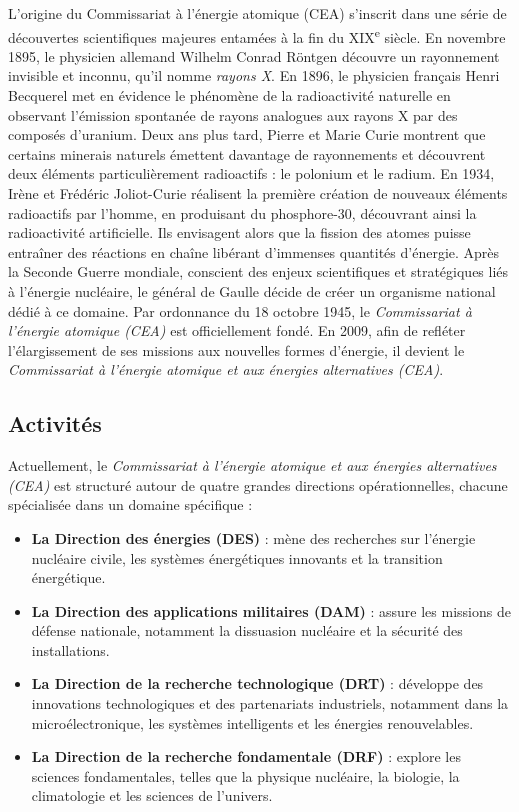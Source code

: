 \documentclass[12pt,a4paper]{report}
\begin{document}
L'origine du Commissariat à l'énergie atomique (CEA) s'inscrit dans une série de découvertes scientifiques majeures entamées à la fin du XIX\textsuperscript{e} siècle. En novembre 1895, le physicien allemand Wilhelm Conrad Röntgen découvre un rayonnement invisible et inconnu, qu'il nomme \textit{rayons X}. En 1896, le physicien français Henri Becquerel met en évidence le phénomène de la radioactivité naturelle en observant l'émission spontanée de rayons analogues aux rayons X par des composés d'uranium. Deux ans plus tard, Pierre et Marie Curie montrent que certains minerais naturels émettent davantage de rayonnements et découvrent deux éléments particulièrement radioactifs : le polonium et le radium. En 1934, Irène et Frédéric Joliot-Curie réalisent la première création de nouveaux éléments radioactifs par l’homme, en produisant du phosphore-30, découvrant ainsi la radioactivité artificielle. Ils envisagent alors que la fission des atomes puisse entraîner des réactions en chaîne libérant d'immenses quantités d’énergie. Après la Seconde Guerre mondiale, conscient des enjeux scientifiques et stratégiques liés à l'énergie nucléaire, le général de Gaulle décide de créer un organisme national dédié à ce domaine. Par ordonnance du 18 octobre 1945, le \textit{Commissariat à l'énergie atomique (CEA)} est officiellement fondé. En 2009, afin de refléter l’élargissement de ses missions aux nouvelles formes d'énergie, il devient le \textit{Commissariat à l'énergie atomique et aux énergies alternatives (CEA)}.

\subsection{Activités}
Actuellement, le \textit{Commissariat à l'énergie atomique et aux énergies alternatives (CEA)} est structuré autour de quatre grandes directions opérationnelles, chacune spécialisée dans un domaine spécifique :

\begin{itemize} \item \textbf{La Direction des énergies (DES)} : mène des recherches sur l’énergie nucléaire civile, les systèmes énergétiques innovants et la transition énergétique.

\item \textbf{La Direction des applications militaires (DAM)} : assure les missions de défense nationale, notamment la dissuasion nucléaire et la sécurité des installations.

\item \textbf{La Direction de la recherche technologique (DRT)} : développe des innovations technologiques et des partenariats industriels, notamment dans la microélectronique, les systèmes intelligents et les énergies renouvelables.

\item \textbf{La Direction de la recherche fondamentale (DRF)} : explore les sciences fondamentales, telles que la physique nucléaire, la biologie, la climatologie et les sciences de l’univers. \end{itemize}
\end{document}
